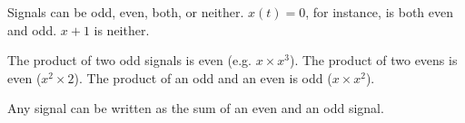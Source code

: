 Signals can be odd, even, both, or neither. $x(t) = 0$, 
for instance, is both even and odd. $x + 1$ is neither. 

The product of two odd signals is even (e.g. $x \times x^3$). 
The product of two evens is even ($x^2 \times 2$). The product of 
an odd and an even is odd ($x \times x^2$). 

Any signal can be written as the sum of an even and an odd signal. 
